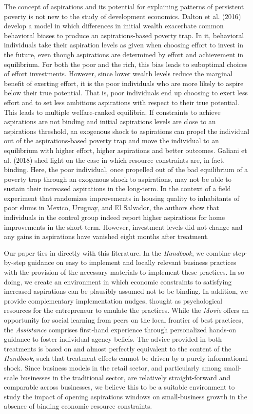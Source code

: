 \documentclass[11.5pt]{article}
\begin{document}
The concept of aspirations and its potential for explaining patterns of persistent poverty is not new to the study of development economics. Dalton et al. (2016) develop a model in which differences in initial wealth exacerbate common behavioral biases to produce an aspirations-based poverty trap. In it, behavioral individuals take their aspiration levels as given when choosing effort to invest in the future, even though aspirations are determined by effort and achievement in equilibrium. For both the poor and the rich, this bias leads to suboptimal choices of effort investments. However, since lower wealth levels reduce the marginal benefit of exerting effort, it is the poor individuals who are more likely to aspire below their true potential. That is, poor individuals end up choosing to exert less effort and to set less ambitious aspirations with respect to their true potential. This leads to multiple welfare-ranked equilibria. If constraints to achieve aspirations are not binding and initial aspirations levels are close to an aspirations threshold, an exogenous shock to aspirations can propel the individual out of the aspirations-based poverty trap and move the individual to an equilibrium with higher effort, higher aspirations and better outcomes. Galiani et al. (2018) shed light on the case in which resource constraints are, in fact, binding. Here, the poor individual, once propelled out of the bad equilibrium of a poverty trap through an exogenous shock to aspirations, may not be able to sustain their increased aspirations in the long-term. In the context of a field experiment that randomizes improvements in housing quality to inhabitants of poor slums in Mexico, Uruguay, and El Salvador, the authors show that individuals in the control group indeed report higher aspirations for home improvements in the short-term. However, investment levels did not change and any gains in aspirations have vanished eight months after treatment.

Our paper ties in directly with this literature. In the \emph{Handbook}, we combine step-by-step guidance on easy to implement and locally relevant business practices with the provision of the necessary materials to implement these practices. In so doing, we create an environment in which economic constraints to satisfying increased aspirations can be plausibly assumed not to be binding. In addition, we provide complementary implementation nudges, thought as psychological resources for the entrepreneur to emulate the practices. While the \emph{Movie} offers an opportunity for social learning from peers on the local frontier of best practices, the \emph{Assistance} comprises first-hand experience through personalized hands-on guidance to foster individual agency beliefs. The advice provided in both treatments is based on and almost perfectly equivalent to the content of the \emph{Handbook}, such that treatment effects cannot be driven by a purely informational shock. Since business models in the retail sector, and particularly among small-scale businesses in the traditional sector, are relatively straight-forward and comparable across businesses, we believe this to be a suitable environment to study the impact of opening aspirations windows on small-business growth in the absence of binding economic resource constraints. 
\end{document}
